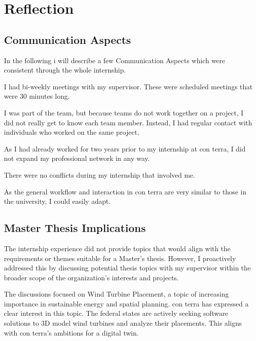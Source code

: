 \documentclass[11pt, titlepage, a4paper]{article}
\begin{document}
\section{Reflection}

 \subsection{Communication Aspects}
In the following i will describe a few Communication Aspects which were consistent through the whole internship.
 \begin{description}[]
     \item[Supervisor Communication:] I had bi-weekly meetings with my supervisor. These were scheduled meetings that were 30 minutes long.
     \item[Teamwork:] I was part of the team, but because teams do not work together on a project, I did not really get to know each team member. Instead, I had regular contact with individuals who worked on the same project. 
     \item[Professional Network:] As I had already worked for two years prior to my internship at con terra, I did not expand my professional network in any way.
     \item[Conflicts:] There were no conflicts during my internship that involved me.
      \item[Applied Communication Skills:]  As the general workflow and interaction in con terra are very similar to those in the university, I could easily adapt.
\end{description}

\subsection{Master Thesis Implications}
The internship experience did not provide topics that would align with the requirements or themes suitable for a Master's thesis. However, I proactively addressed this by discussing potential thesis topics with my supervisor within the broader scope of the organization's interests and projects.

The discussions focused on Wind Turbine Placement, a topic of increasing importance in sustainable energy and spatial planning. con terra has expressed a clear interest in this topic. The federal states are actively seeking software solutions to 3D model wind turbines and analyze their placements. This aligns with con terra's ambitions for a digital twin.
\end{document}
